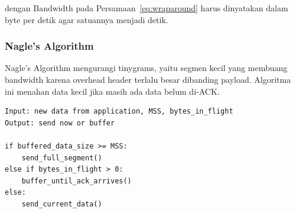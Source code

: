 dengan $\text{Bandwidth}$ pada Persamaan~\ref{eq:wraparound} harus dinyatakan dalam byte per detik agar satuannya menjadi detik.

\subsubsection{Nagle's Algorithm}
\begin{jawab}
Nagle's Algorithm mengurangi tinygrams, yaitu segmen kecil yang membuang bandwidth karena overhead header terlalu besar dibanding payload. Algoritma ini menahan data kecil jika masih ada data belum di-ACK.
\end{jawab}

\begin{lstlisting}[caption={Pseudocode Nagle's Algorithm}, label={lst:nagle}]
Input: new data from application, MSS, bytes_in_flight
Output: send now or buffer

if buffered_data_size >= MSS:
    send_full_segment()
else if bytes_in_flight > 0:
    buffer_until_ack_arrives()
else:
    send_current_data()
\end{lstlisting}
